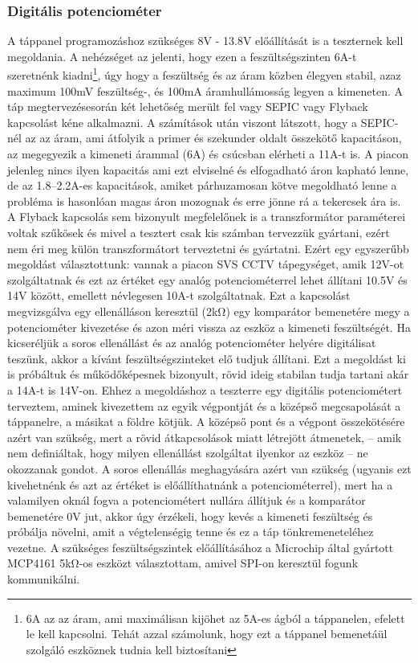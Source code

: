 \documentclass[a4paper, 12pt]{article}
\newcommand{\tab}{\hspace*{1em}}
\begin{document}
\subsubsection{Digitális potenciométer}
\tab A táppanel programozáshoz szükséges 8V - 13.8V előállítását is a teszternek kell megoldania. A nehézséget az jelenti, hogy ezen a feszültségszinten 6A-t szeretnénk kiadni\footnote{6A az az áram, ami maximálisan kijöhet az 5A-es ágból a táppanelen, efelett le kell kapcsolni. Tehát azzal számolunk, hogy ezt a táppanel bemenetáül szolgáló eszköznek tudnia kell biztosítani}, úgy hogy a feszültség és az áram közben élegyen stabil, azaz maximum 100mV feszültség-, és 100mA áramhullámosság legyen a kimeneten. A táp megtervezésesorán két lehetőség merült fel vagy SEPIC vagy Flyback kapcsolást kéne alkalmazni. A számítások után viszont látszott, hogy a SEPIC-nél az az áram, ami átfolyik a primer és szekunder oldalt összekötő kapacitáson, az megegyezik a kimeneti árammal (6A) és csúcsban elérheti a 11A-t is. A piacon jelenleg nincs ilyen kapacitás ami ezt elviselné és elfogadható áron kapható lenne, de az 1.8--2.2A-es kapacitások, amiket párhuzamosan kötve megoldható lenne a probléma is hasonlóan magas áron mozognak és erre jönne rá a tekercsek ára is. A Flyback kapcsolás sem bizonyult megfelelőnek is a transzformátor paraméterei voltak szűkösek és mivel a tesztert csak kis számban tervezzük gyártani, ezért nem éri meg külön transzformátort terveztetni és gyártatni. Ezért egy egyszerűbb megoldást választottunk: vannak a piacon SVS CCTV tápegységet\cite{tap}, amik 12V-ot szolgáltatnak és ezt az értéket egy analóg potenciométerrel lehet állítani 10.5V és 14V között, emellett névlegesen 10A-t szolgáltatnak. Ezt a kapcsolást megvizsgálva egy ellenálláson keresztül (2k\si{\ohm}) egy komparátor bemenetére megy a potenciométer kivezetése és azon méri vissza az eszköz a kimeneti feszültségét. Ha kicseréljük a soros ellenállást és az analóg potenciométer helyére digitálisat teszünk, akkor a kívánt feszültségszinteket elő tudjuk állítani. Ezt a megoldást ki is próbáltuk és működőképesnek bizonyult, rövid ideig stabilan tudja tartani akár a 14A-t is 14V-on.
Ehhez a megoldáshoz a teszterre egy digitális potenciométert terveztem, aminek kivezettem az egyik végpontját és a középső megcsapolását a táppanelre, a másikat a földre kötjük. A középső pont és a végpont összekötésére azért van szükség, mert a rövid átkapcsolások miatt létrejött átmenetek, -- amik nem definiáltak, hogy milyen ellenállást szolgáltat ilyenkor az eszköz -- ne okozzanak gondot. A soros ellenállás meghagyására azért van szükség (ugyanis ezt kivehetnénk és azt az értéket is előállíthatnánk a potenciométerrel), mert ha a valamilyen oknál fogva a potenciométert nullára állítjuk és a komparátor bemenetére 0V jut, akkor úgy érzékeli, hogy kevés a kimeneti feszültség és próbálja növelni, amit a végtelenségig tenne és ez a táp tönkremeneteléhez vezetne. A szükséges feszültségszintek előállításához a Microchip\textregistered{} által gyártott MCP4161\cite{mcp4161} 5k\si{\ohm}-os eszközt választottam, amivel SPI-on keresztül fogunk kommunikálni.
\end{document}
